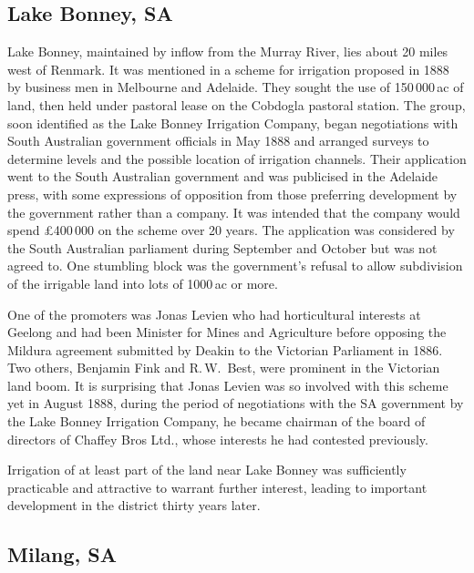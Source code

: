 \subsection*{Lake Bonney, SA}

Lake Bonney, maintained by inflow from the Murray River, lies about 20
miles west of Renmark.  It was mentioned in a scheme for irrigation
proposed in 1888 by business men in Melbourne and Adelaide.  They
sought the use of 150\,000\,ac of land, then held under pastoral lease
on the Cobdogla pastoral station.  The group, soon identified as the
Lake Bonney Irrigation Company, began negotiations with South
Australian government officials in May 1888 and arranged surveys to
determine levels and the possible location of irrigation
channels. Their application went to the South Australian government
and was publicised in the Adelaide press, with some expressions of
opposition from those preferring development by the government rather
than a company.  It was intended that the company would spend
\pounds400\,000 on the scheme over 20 years.  The application was
considered by the South Australian parliament during September and
October but was not agreed to.  One stumbling block was the
government's refusal to allow subdivision of the irrigable land into
lots of 1000\,ac or more.

One of the promoters was Jonas Levien who had horticultural interests
at Geelong and had been Minister for Mines and Agriculture before
opposing the Mildura agreement submitted by Deakin to the Victorian
Parliament in 1886.  Two others, Benjamin Fink and R.\,W.~Best, were
prominent in the Victorian land boom.  It is surprising that Jonas
Levien was so involved with this scheme yet in August 1888, during the
period of negotiations with the SA government by the Lake Bonney
Irrigation Company, he became chairman of the board of directors of
Chaffey Bros Ltd., whose interests he had contested
previously.

Irrigation of at least part of the land near Lake Bonney was
sufficiently practicable and attractive to warrant further interest,
leading to important development in the district thirty years later.

\subsection*{Milang, SA}


